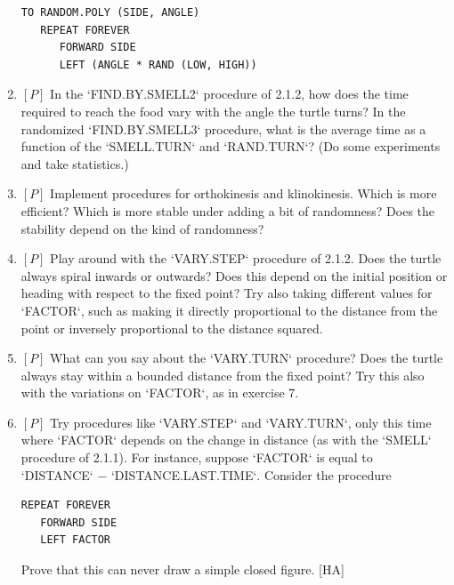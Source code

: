 \documentclass{book}
\begin{document}
\begin{enumerate}
\begin{verbatim}
TO RANDOM.POLY (SIDE, ANGLE)
   REPEAT FOREVER
      FORWARD SIDE
      LEFT (ANGLE * RAND (LOW, HIGH))
\end{verbatim}
\item $[P]$ In the \textsc{`FIND.BY.SMELL2`} procedure of 2.1.2, how does the time
required to reach the food vary with the angle the turtle turns? In the
randomized \textsc{`FIND.BY.SMELL3`} procedure, what is the average time as a
function of the \textsc{`SMELL.TURN`} and \textsc{`RAND.TURN`}? (Do some experiments and
take statistics.)
\item $[P]$ Implement procedures for orthokinesis and klinokinesis. Which is
more efficient? Which is more stable under adding a bit of randomness?
Does the stability depend on the kind of randomness?
\item $[P]$ Play around with the \textsc{`VARY.STEP`} procedure of 2.1.2. Does the
turtle always spiral inwards or outwards? Does this depend on the initial
position or heading with respect to the fixed point? Try also taking
different values for \textsc{`FACTOR`}, such as making it directly proportional to
the distance from the point or inversely proportional to the distance
squared.
\item $[P]$ What can you say about the \textsc{`VARY.TURN`} procedure? Does the
turtle always stay within a bounded distance from the fixed point? Try
this also with the variations on \textsc{`FACTOR`}, as in exercise 7.
\item $[P]$ Try procedures like \textsc{`VARY.STEP`} and \textsc{`VARY.TURN`}, only this time
where \textsc{`FACTOR`} depends on the change in distance (as with the \textsc{`SMELL`}
procedure of 2.1.1). For instance, suppose \textsc{`FACTOR`} is equal to \textsc{`DISTANCE`} $-$
\textsc{`DISTANCE.LAST.TIME`}. Consider the procedure

\begin{verbatim}
REPEAT FOREVER
   FORWARD SIDE
   LEFT FACTOR
\end{verbatim}
\noindent Prove that this can never draw a simple closed figure. [HA]


\end{enumerate}
\end{document}
